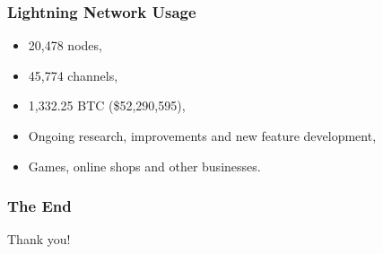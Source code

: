 \documentclass{beamer}
\begin{document}
\begin{frame}
  \frametitle{Lightning Network Usage}
  \begin{itemize}
  \item 20,478 nodes,
  \item 45,774 channels,
  \item 1,332.25 BTC (\$52,290,595),
  \item Ongoing research, improvements and new feature development,
  \item Games, online shops and other businesses.
  \end{itemize}
\end{frame}

\begin{frame}
  \frametitle{The End}
  \begin{center}
    Thank you!
  \end{center}
\end{frame}
\end{document}
